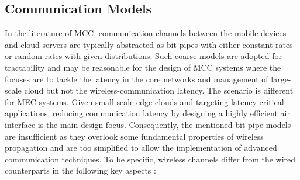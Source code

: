 \documentclass[journal]{IEEEtran}
\begin{document}
\subsection{Communication Models}
In the literature of  MCC,  communication channels  between the mobile devices and cloud servers are typically abstracted as bit pipes with  either constant rates or random rates  with given  distributions. Such coarse  models are adopted for tractability and may be reasonable for the design of  MCC systems where the focuses are to tackle the latency in the core networks and management of large-scale cloud but not the wireless-communication latency. The scenario is different for MEC systems. Given small-scale edge clouds and targeting latency-critical applications, reducing communication latency by designing a highly efficient air interface is the main design focus. Consequently,  the mentioned bit-pipe models are insufficient as they overlook some fundamental properties of wireless propagation and are too simplified to allow the implementation of  advanced communication techniques. To be specific, wireless channels differ from the wired counterparts in the following key aspects \cite{Goldsmith2005}:
\end{document}
